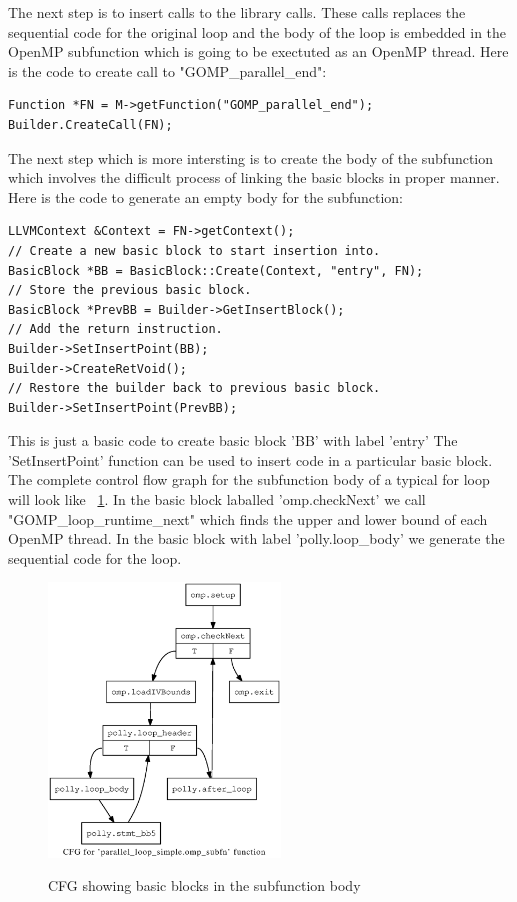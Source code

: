 The next step is to insert calls to the library calls. These calls replaces the sequential code for
the original loop and the body of the loop is embedded in the OpenMP subfunction which is
going to be exectuted as an OpenMP thread. Here is the code to create call to "GOMP\_parallel\_end":
{\footnotesize
\begin{lstlisting}
Function *FN = M->getFunction("GOMP_parallel_end");
Builder.CreateCall(FN);
\end{lstlisting}
}

The next step which is more intersting is to create the body of the subfunction which involves the difficult process of
linking the basic blocks in proper manner. Here is the code to generate an empty body for the subfunction:
{\footnotesize
\begin{lstlisting}
LLVMContext &Context = FN->getContext();
// Create a new basic block to start insertion into.
BasicBlock *BB = BasicBlock::Create(Context, "entry", FN);
// Store the previous basic block.
BasicBlock *PrevBB = Builder->GetInsertBlock();
// Add the return instruction.
Builder->SetInsertPoint(BB);
Builder->CreateRetVoid();
// Restore the builder back to previous basic block.
Builder->SetInsertPoint(PrevBB);
\end{lstlisting}
}
This is just a basic code to create basic block 'BB' with label 'entry' The 'SetInsertPoint' function
can be used to insert code in a particular basic block. The complete control flow graph for the
subfunction body of a typical for loop will look like ~\ref{fig:subfunction_cfg}. In the basic
block laballed 'omp.checkNext' we call "GOMP\_loop\_runtime\_next" which finds the upper and 
lower bound of each OpenMP thread. In the basic block with label 'polly.loop\_body' we
generate the sequential code for the loop.

\begin{figure}
\begin{center}
  \label{fig:subfunction_cfg}
  \includegraphics[width=0.55\textwidth]{images/cfg2.ps}
  \caption{CFG showing basic blocks in the subfunction body}
\end{center}
\end{figure}


